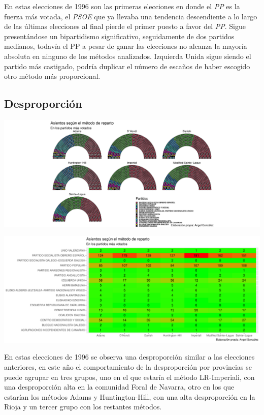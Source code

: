 \documentclass[12pt,a4paper,]{book}
\numberwithin{dummy}{section}
\theoremstyle{ocrenumbox}
\theoremstyle{blacknumex}
\theoremstyle{blacknumbox}
\theoremstyle{ocrenum}
\theoremstyle{ocrenum}
\begin{document}
En estas elecciones de 1996 son las primeras elecciones en donde el
\emph{PP} es la fuerza más votada, el \emph{PSOE} que ya llevaba una
tendencia descendiente a lo largo de las últimas elecciones al final
pierde el primer puesto a favor del \emph{PP}. Sigue presentándose un
bipartidismo significativo, seguidamente de dos partidos medianos,
todavía el PP a pesar de ganar las elecciones no alcanza la mayoría
absoluta en ninguno de los métodos analizados. Izquierda Unida sigue
siendo el partido más castigado, podría duplicar el número de escaños de
haber escogido otro método más proporcional.

\hypertarget{desproporciuxf3n-6}{%
\subsection{Desproporción}\label{desproporciuxf3n-6}}

\begin{center}\includegraphics[width=1\linewidth]{figurasR/unnamed-chunk-97-1} \end{center}

\begin{center}\includegraphics[width=1\linewidth]{figurasR/unnamed-chunk-97-2} \end{center}

En estas elecciones de 1996 se observa una desproporción similar a las
elecciones anteriores, en este año el comportamiento de la desproporción
por provincias se puede agrupar en tres grupos, uno en el que estaría el
método LR-Imperiali, con una desproporción alta en la comunidad Foral de
Navarra, otro en los que estarían los métodos Adams y Huntington-Hill,
con una alta desproporción en la Rioja y un tercer grupo con los
restantes métodos.
\end{document}
